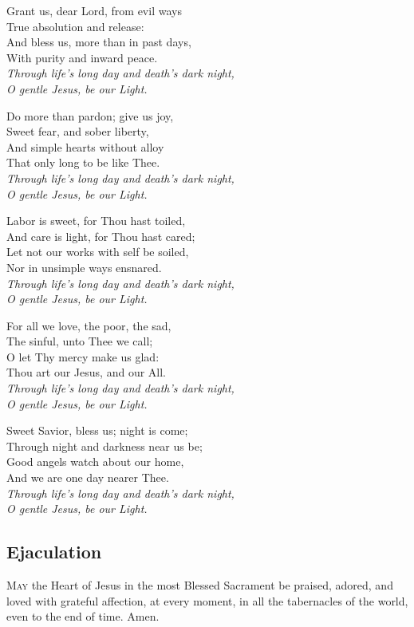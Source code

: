 \documentclass[9pt]{article}
\begin{document}
\begin{multicols}{3}
Grant us, dear Lord, from evil ways\\
True absolution and release:\\
And bless us, more than in past days,\\
With purity and inward peace.\\
\textit{Through life’s long day and death’s dark night,\\
O gentle Jesus, be our Light.}

Do more than pardon; give us joy,\\
Sweet fear, and sober liberty,\\
And simple hearts without alloy\\
That only long to be like Thee.\\
\textit{Through life’s long day and death’s dark night,\\
O gentle Jesus, be our Light.}

Labor is sweet, for Thou hast toiled,\\
And care is light, for Thou hast cared;\\
Let not our works with self be soiled,\\
Nor in unsimple ways ensnared.\\
\textit{Through life’s long day and death’s dark night,\\
O gentle Jesus, be our Light.}

For all we love, the poor, the sad,\\
The sinful, unto Thee we call;\\
O let Thy mercy make us glad:\\
Thou art our Jesus, and our All.\\
\textit{Through life’s long day and death’s dark night,\\
O gentle Jesus, be our Light.}

Sweet Savior, bless us; night is come;\\
Through night and darkness near us be;\\
Good angels watch about our home,\\
And we are one day nearer Thee.\\
\textit{Through life’s long day and death’s dark night,\\
O gentle Jesus, be our Light.}

\subsection*{Ejaculation}

\textsc{May} the Heart of Jesus in the most Blessed Sacrament be praised,
adored, and loved with grateful affection, at every moment, in all the
tabernacles of the world, even to the end of time. Amen.

\end{multicols}
\end{document}

